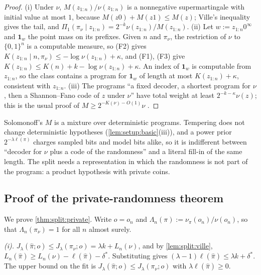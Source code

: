 \begin{proof} (i) Under $\nu$, $M(z_{1:n})/\nu(z_{1:n})$ is a nonnegative supermartingale with initial value at most $1$, because $M(z0)+M(z1)\le M(z)$; Ville's inequality gives the tail, and $\Pi_1(\pi_\nu\mid z_{1:n})=2^{-k}\nu(z_{1:n})/M(z_{1:n})$. (ii) Let $w:=z_{1:n}0^\infty$ and $\mathbf 1_w$ the point mass on its prefixes. Given $n$ and $\pi_\nu$, the restriction of $\nu$ to $\{0,1\}^n$ is a computable measure, so (F2) gives $K(z_{1:n}\mid n,\pi_\nu)\le-\log\nu(z_{1:n})+\kappa$, and (F1), (F3) give $K(z_{1:n})\le K(n)+k-\log\nu(z_{1:n})+\kappa$. An index of $\mathbf 1_w$ is computable from $z_{1:n}$, so the class contains a program for $\mathbf 1_w$ of length at most $K(z_{1:n})+\kappa$, consistent with $z_{1:n}$. (iii) The programs ``a fixed decoder, a shortest program for $\nu$, then a Shannon--Fano code of $z$ under $\nu$'' have total weight at least $2^{-k-\kappa}\nu(z)$; this is the usual proof of $M\ge2^{-K(\nu)-O(1)}\nu$ \citep{li2008introduction}.
\end{proof}

\begin{remark}\label{rem:split:siprograms}
Solomonoff's $M$ is a mixture over deterministic programs. Tempering does not change deterministic hypotheses (\cref{lem:setup:basic}(iii)), and a power prior $2^{-\lambda\ell(\pi)}$ charges sampled bits and model bits alike, so it is indifferent between ``decoder for $\nu$ plus a code of the randomness'' and a literal fill-in of the same length. The split needs a representation in which the randomness is not part of the program: a product hypothesis with private coins.
\end{remark}

\subsection{Proof of the private-randomness theorem}\label{app:split:private}

We prove \cref{thm:split:private}. Write $o=o_n$ and $\Lambda_n(\pi):=\nu_\pi(o_n)/\nu(o_n)$, so that $\Lambda_n(\pi_\nu)=1$ for all $n$ almost surely.

\emph{(i).} $J_\lambda(\hat\pi;o)\le J_\lambda(\pi_\nu;o)=\lambda k+L_n(\nu)$, and by \cref{lem:split:ville}, $L_n(\hat\pi)\ge L_n(\nu)-\ell(\hat\pi)-\delta^*$. Substituting gives $(\lambda-1)\ell(\hat\pi)\le\lambda k+\delta^*$. The upper bound on the fit is $J_\lambda(\hat\pi;o)\le J_\lambda(\pi_\nu;o)$ with $\lambda\ell(\hat\pi)\ge0$.

